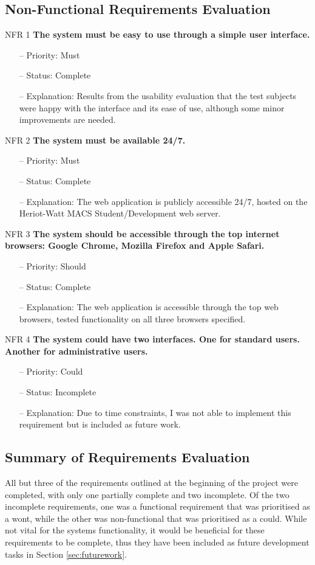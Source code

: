 \subsection{Non-Functional Requirements Evaluation}
\noindent
NFR 1 \textbf{The system must be easy to use through a simple user interface.}
\begin{itemize}
\item[--] Priority: Must
\item[--] Status: Complete
\item[--] Explanation: Results from the usability evaluation that the test subjects were happy with the interface and its ease of use, although some minor improvements are needed.
\end{itemize}
\noindent
NFR 2 \textbf{The system must be available 24/7.}
\begin{itemize}
\item[--] Priority: Must
\item[--] Status: Complete
\item[--] Explanation: The web application is publicly accessible 24/7, hosted on the Heriot-Watt MACS Student/Development web server.
\end{itemize}
\noindent
NFR 3 \textbf{The system should be accessible through the top internet browsers: Google Chrome, Mozilla Firefox and Apple Safari.}
\begin{itemize}
\item[--] Priority: Should
\item[--] Status: Complete
\item[--] Explanation: The web application is accessible through the top web browsers, tested functionality on all three browsers specified.
\end{itemize}

\noindent
NFR 4 \textbf{The system could have two interfaces. One for standard users. Another for administrative users.}
\begin{itemize}
\item[--] Priority: Could
\item[--] Status: Incomplete
\item[--] Explanation: Due to time constraints, I was not able to implement this requirement but is included as future work.
\end{itemize}

\subsection{Summary of Requirements Evaluation}
All but three of the requirements outlined at the beginning of the project were completed, with only one partially complete and two incomplete. Of the two incomplete requirements, one was a functional requirement that was prioritised as a wont, while the other was non-functional that was prioritised as a could. While not vital for the systems functionality, it would be beneficial for these requirements to be complete, thus they have been included as future development tasks in Section \ref{sec:futurework}.

